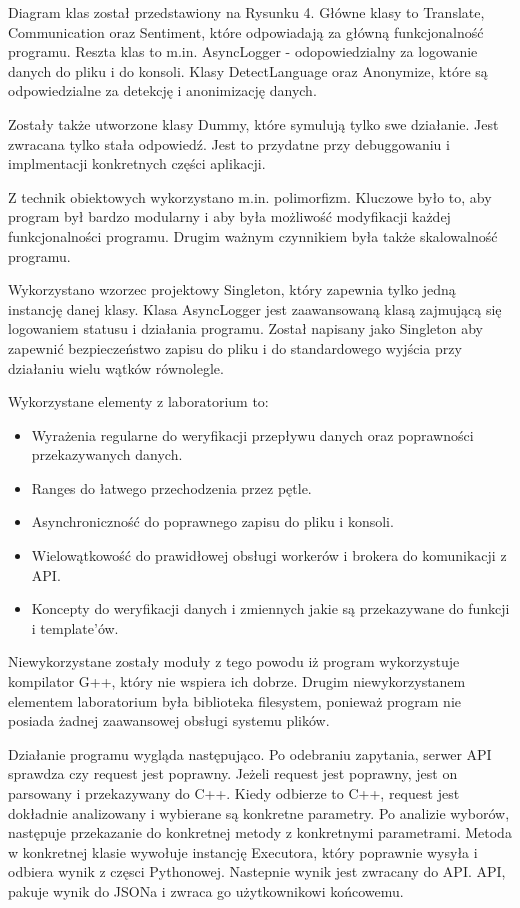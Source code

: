 \documentclass{article}
\begin{document}
Diagram klas został przedstawiony na Rysunku 4. Główne klasy to Translate, Communication oraz Sentiment, które odpowiadają za główną funkcjonalność programu.
Reszta klas to m.in. AsyncLogger - odopowiedzialny za logowanie danych do pliku i do konsoli. Klasy DetectLanguage oraz Anonymize, które są odpowiedzialne za detekcję i anonimizację danych. 

Zostały także utworzone klasy Dummy, które symulują tylko swe działanie. Jest zwracana tylko stała odpowiedź. Jest to przydatne przy debuggowaniu i implmentacji konkretnych części aplikacji. 

Z technik obiektowych wykorzystano m.in. polimorfizm. Kluczowe było to, aby program był bardzo modularny i aby była możliwość modyfikacji każdej funkcjonalności programu. Drugim ważnym czynnikiem była także skalowalność programu. 

Wykorzystano wzorzec projektowy Singleton, który zapewnia tylko jedną instancję danej klasy. Klasa AsyncLogger jest zaawansowaną klasą zajmującą się logowaniem statusu i działania programu. Został napisany jako Singleton aby zapewnić bezpieczeństwo zapisu do pliku i do standardowego wyjścia przy działaniu wielu wątków równolegle.

\noindent Wykorzystane elementy z laboratorium to: 
\begin{itemize}
  \item Wyrażenia regularne do weryfikacji przepływu danych oraz poprawności przekazywanych danych.
  \item Ranges do łatwego przechodzenia przez pętle.
  \item Asynchroniczność do poprawnego zapisu do pliku i konsoli.
  \item Wielowątkowość do prawidłowej obsługi workerów i brokera do komunikacji z API.
  \item Koncepty do weryfikacji danych i zmiennych jakie są przekazywane do funkcji i template'ów.
\end{itemize}

Niewykorzystane zostały moduły z tego powodu iż program wykorzystuje kompilator G++, który nie wspiera ich dobrze. Drugim niewykorzystanem elementem laboratorium była biblioteka filesystem, ponieważ program nie posiada żadnej zaawansowej obsługi systemu plików.

Działanie programu wygląda następująco. Po odebraniu zapytania, serwer API sprawdza czy request jest poprawny. Jeżeli request jest poprawny, jest on parsowany i przekazywany do C++. Kiedy odbierze to C++, request jest dokładnie analizowany i wybierane są konkretne parametry. Po analizie wyborów, następuje przekazanie do konkretnej metody z konkretnymi parametrami. Metoda w konkretnej klasie wywołuje instancję Executora, który poprawnie wysyła i odbiera wynik z częsci Pythonowej. Nastepnie wynik jest zwracany do API. API, pakuje wynik do JSONa i zwraca go użytkownikowi końcowemu.
\end{document}
